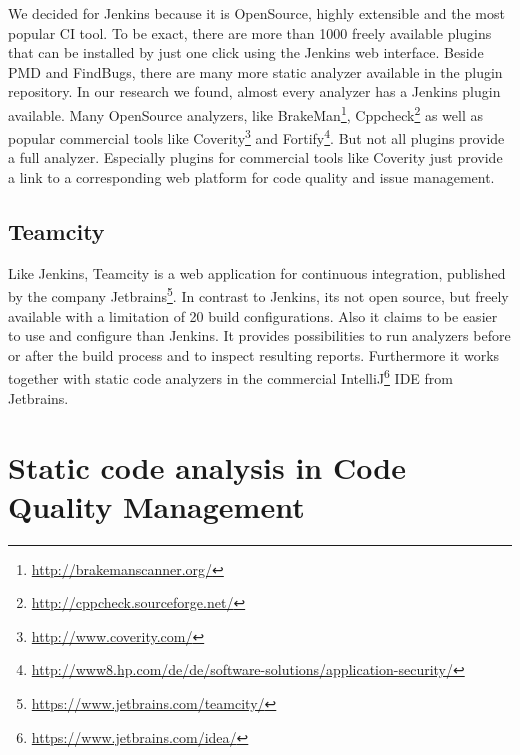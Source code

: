 \documentclass[conference]{IEEEtran}
\begin{document}
We decided for Jenkins because it is OpenSource, highly extensible and the most popular CI tool. To be exact, there are more than 1000 freely available plugins that can be installed by just one click using the Jenkins web interface.
Beside PMD and FindBugs, there are many more static analyzer available in the plugin repository.
In our research we found, almost every analyzer has a Jenkins plugin available.
Many OpenSource analyzers, like BrakeMan\footnote{\href{http://brakemanscanner.org/}{http://brakemanscanner.org/}}, Cppcheck\footnote{\href{http://cppcheck.sourceforge.net/}{http://cppcheck.sourceforge.net/}} as well as popular commercial tools like Coverity\footnote{\href{http://www.coverity.com/}{http://www.coverity.com/}} and Fortify\footnote{\href{http://www8.hp.com/de/de/software-solutions/application-security/}{http://www8.hp.com/de/de/software-solutions/application-security/}}.
But not all plugins provide a full analyzer.
Especially plugins for commercial tools like Coverity just provide a link to a corresponding web platform for code quality and issue management. 




\subsection{Teamcity}
\label{subsec:static_code_analysis_teamcity}
Like Jenkins, Teamcity is a web application for continuous integration, published by the company Jetbrains\footnote{\href{https://www.jetbrains.com/teamcity/}{https://www.jetbrains.com/teamcity/}}. In contrast to Jenkins, its not open source, but freely available with a limitation of 20 build configurations.
Also it claims to be easier to use and configure than Jenkins.
It provides possibilities to run analyzers before or after the build process and to inspect resulting reports.
Furthermore it works together with static code analyzers in the commercial IntelliJ\footnote{\href{https://www.jetbrains.com/idea/}{https://www.jetbrains.com/idea/}} IDE from Jetbrains.



\section{Static code analysis in Code Quality Management}
\label{sec:static_code_analysis_code_quality_management}
\end{document}
